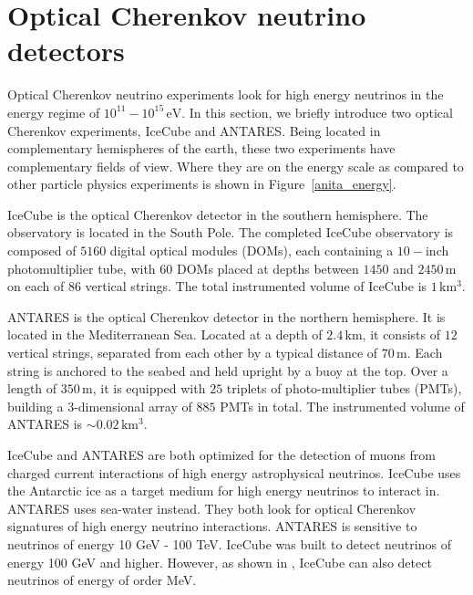 \section{Optical Cherenkov neutrino detectors}

Optical Cherenkov neutrino experiments look for high energy neutrinos in the energy regime of $10^{11} - 10^{15}\, \mathrm{eV}$. In this section, we briefly introduce two optical Cherenkov experiments, IceCube and ANTARES. Being located in complementary hemispheres of the earth, these two experiments have complementary fields of view. Where they are on the energy scale as compared to other particle physics experiments is shown in Figure~\ref{anita_energy}.

IceCube is the optical Cherenkov detector in the southern hemisphere. The observatory is located in the South Pole. The completed IceCube observatory is composed of $5160$ digital optical modules (DOMs), each containing a $10-$inch photomultiplier tube, with $60$ DOMs placed at depths between $1450$ and $2450 \, \mathrm{m}$ on each of $86$ vertical strings. The total instrumented volume of IceCube is $1 \, \mathrm{km^3}$. 

ANTARES is the optical Cherenkov detector in the northern hemisphere. It is located in the Mediterranean Sea. 
Located at a depth of $2.4 \, \mathrm{km}$, it consists of $12$ vertical strings, separated from each other by a typical distance of $70 \, \mathrm{m}$. Each string is anchored to the seabed and held upright by a buoy at the top. Over a length of $350 \, \mathrm{m}$, it is equipped with $25$ triplets of photo-multiplier tubes (PMTs), building a 3-dimensional array of $885$ PMTs in total. The instrumented volume of ANTARES is $\sim  0.02 \, \mathrm{km^3}$. 

IceCube and ANTARES are both optimized for the detection of muons from charged current interactions of high energy astrophysical neutrinos. IceCube uses the Antarctic ice as a target medium for high energy neutrinos to interact in. ANTARES uses sea-water instead. They both look for optical Cherenkov signatures of high energy neutrino interactions. ANTARES is sensitive to neutrinos of energy 10 GeV - 100 TeV. IceCube was built to detect neutrinos of energy 100 GeV and higher. However, as shown in \cite{IClow}, IceCube can also detect neutrinos of energy of order MeV. 


